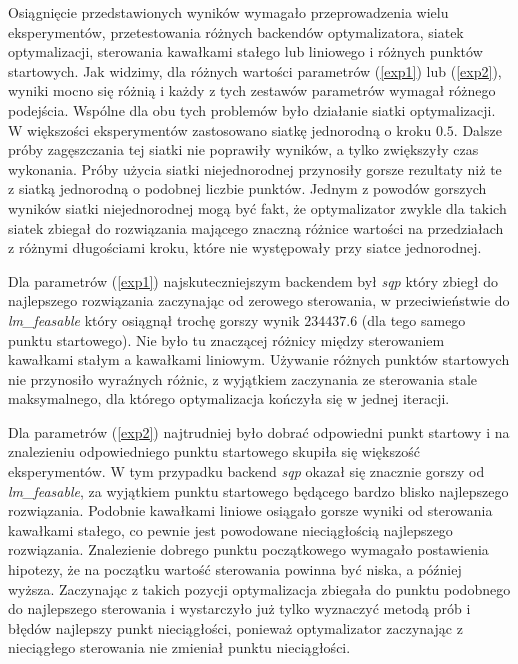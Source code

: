 \documentclass[11pt]{article}
\begin{document}
Osiągnięcie przedstawionych wyników wymagało przeprowadzenia wielu eksperymentów, przetestowania różnych backendów optymalizatora, siatek optymalizacji, sterowania kawałkami stałego lub liniowego i różnych punktów startowych.
Jak widzimy, dla różnych wartości parametrów (\ref{exp1}) lub (\ref{exp2}), wyniki mocno się różnią i każdy z tych zestawów parametrów wymagał różnego podejścia. Wspólne dla obu tych problemów było działanie siatki optymalizacji. W większości eksperymentów zastosowano siatkę jednorodną o kroku $0.5$. Dalsze próby zagęszczania tej siatki nie poprawiły wyników, a tylko zwiększyły czas wykonania. Próby użycia siatki niejednorodnej przynosiły gorsze rezultaty niż te z siatką jednorodną o podobnej liczbie punktów. Jednym z powodów gorszych wyników siatki niejednorodnej mogą być fakt, że optymalizator zwykle dla takich siatek zbiegał do rozwiązania mającego znaczną różnice wartości na przedziałach z różnymi długościami kroku, które nie występowały przy siatce jednorodnej.

Dla parametrów (\ref{exp1}) najskuteczniejszym backendem był {\it sqp\/} który zbiegł do najlepszego rozwiązania zaczynając od zerowego sterowania, w przeciwieństwie do {\it lm\_feasable\/} który osiągnął trochę gorszy wynik $234437.6$ (dla tego samego punktu startowego). Nie było tu znaczącej różnicy między sterowaniem kawałkami stałym a kawałkami liniowym. Używanie różnych punktów startowych nie przynosiło wyraźnych różnic, z wyjątkiem zaczynania ze sterowania stale maksymalnego, dla którego optymalizacja kończyła się w jednej iteracji.

Dla parametrów (\ref{exp2}) najtrudniej było dobrać odpowiedni punkt startowy i na znalezieniu odpowiedniego punktu startowego skupiła się większość eksperymentów. W tym przypadku backend {\it sqp\/} okazał się znacznie gorszy od {\it lm\_feasable}, za wyjątkiem punktu startowego będącego bardzo blisko najlepszego rozwiązania. Podobnie kawałkami liniowe osiągało gorsze wyniki od sterowania kawałkami stałego, co pewnie jest powodowane nieciągłością  najlepszego rozwiązania. Znalezienie dobrego punktu początkowego wymagało postawienia hipotezy, że na początku wartość sterowania powinna być niska, a później wyższa. Zaczynając z takich pozycji optymalizacja zbiegała do punktu podobnego do najlepszego sterowania i wystarczyło już tylko wyznaczyć metodą prób i błędów najlepszy punkt nieciągłości, ponieważ optymalizator zaczynając z nieciągłego sterowania nie zmieniał punktu nieciągłości.
\end{document}

